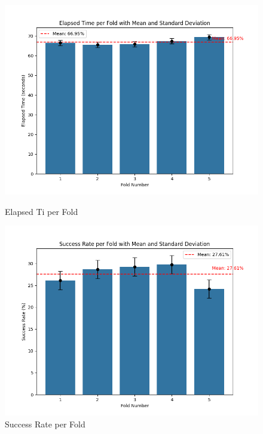 \begin{figure}[h]
    \centering
    \begin{minipage}{0.45\textwidth}
        \centering
        \includegraphics[width=\textwidth]{images/elapsed-times-with-mean-and-std.png}
        \caption{Elapsed Ti per Fold}
    \end{minipage}
    \hfill
    \begin{minipage}{0.45\textwidth}
        \centering
        \includegraphics[width=\textwidth]{images/success-rate-with-mean-and-std.png}
        \caption{Success Rate per Fold}
    \end{minipage}
\end{figure}

